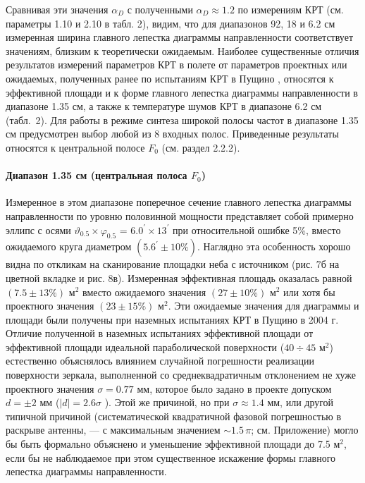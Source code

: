 Сравнивая эти значения $\alpha_D$ с полученными $\alpha_D \approx 1.2$ по измерениям КРТ (см.
параметры 1.10 и 2.10 в табл. 2), видим, что для диапазонов 92, 18 и 6.2 см измеренная ширина
главного лепестка диаграммы направленности соответствует значениям, близким к теоретически
ожидаемым. Наиболее существенные отличия результатов измерений параметров КРТ в полете от параметров
проектных или ожидаемых, полученных ранее по испытаниям КРТ в Пущино \cite{SRT_report_2004},
относятся к эффективной площади и к форме главного лепестка диаграммы направленности в диапазоне
1.35 см, а также к температуре шумов КРТ в диапазоне 6.2 см (табл.~2). Для работы в режиме синтеза
широкой полосы частот в диапазоне 1.35 см предусмотрен выбор любой из 8 входных полос. Приведенные
результаты относятся к центральной полосе $F_0$ (см. раздел 2.2.2).

\paragraph{Диапазон 1.35 см (центральная полоса $F_0$)}

Измеренное в этом диапазоне поперечное сечение главного лепестка диаграммы направленности по уровню
половинной мощности представляет собой примерно эллипс с осями $\vartheta_{0.5}\times \varphi_{0.5}$
= $6.0^\prime\times 13^\prime$ при относительной ошибке 5\%, вместо ожидаемого круга диаметром
$(5.6^\prime \pm 10\%)$. Наглядно эта особенность хорошо видна по откликам на сканирование площадки
неба с источником (рис. 7б на цветной вкладке и рис. 8в). Измеренная эффективная площадь оказалась
равной $(7.5 \pm 13\%)$ м$^2$ вместо ожидаемого значения $(27 \pm 10\%)$ м$^2$ или хотя бы
проектного значения $(23 \pm 15\%)$ м$^2$. Эти ожидаемые значения для диаграммы и площади были
получены при наземных испытаниях КРТ в Пущино в 2004 г. Отличие полученной в наземных испытаниях
эффективной площади от эффективной площади идеальной параболической поверхности ($40 \div 45$ м$^2$)
естественно объяснялось влиянием случайной погрешности реализации поверхности зеркала, выполненной
со среднеквадратичным отклонением не хуже проектного значения $\sigma = 0.77$ мм, которое было
задано в проекте допуском $d = \pm 2$ мм ($\vert d \vert = 2.6 \sigma$ \cite{Esepkina_1973}). Этой
же причиной, но при $\sigma \approx 1.4$ мм, или другой типичной причиной (систематической
квадратичной фазовой погрешностью в раскрыве антенны, --- с максимальным значением $\sim 1.5\,\pi$;
см. Приложение) могло бы быть формально объяснено и уменьшение эффективной площади до 7.5 м$^2$,
если бы не наблюдаемое при этом существенное искажение формы главного лепестка диаграммы
направленности.

